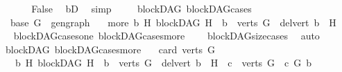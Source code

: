 \begin{isabellebody}
\ \ \ \ \isamarkupfalse%
\ \isamarkupfalse%
\ {\isachardoublequoteopen}False{\isachardoublequoteclose}\ \isamarkupfalse%
\ bD\ \isamarkupfalse%
\ simp\isanewline
\ \ \isamarkupfalse%
\isanewline
{}\isamarkupfalse%
%
\endisatagproof
{\isafoldproof}%
%
\isadelimproof
\isanewline
%
\endisadelimproof
\isanewline
{}\isamarkupfalse%
\ {\isacharparenleft}{\kern0pt}\ blockDAG{\isacharparenright}{\kern0pt}\ blockDAG{\isacharunderscore}{\kern0pt}cases{\isacharcolon}{\kern0pt}\isanewline
\ \ \ {\isacharparenleft}{\kern0pt}base{\isacharparenright}{\kern0pt}\ {\isachardoublequoteopen}{\isacharparenleft}{\kern0pt}G\ {\isacharequal}{\kern0pt}\ gen{\isacharunderscore}{\kern0pt}graph{\isacharparenright}{\kern0pt}{\isachardoublequoteclose}\isanewline
\ \ {\isacharbar}{\kern0pt}\ {\isacharparenleft}{\kern0pt}more{\isacharparenright}{\kern0pt}\ {\isachardoublequoteopen}{\isacharparenleft}{\kern0pt}{\isasymexists}b\ H{\isachardot}{\kern0pt}\ {\isacharparenleft}{\kern0pt}blockDAG\ H\ {\isasymand}\ b\ {\isasymin}\ verts\ G\ {\isasymand}\ del{\isacharunderscore}{\kern0pt}vert\ b\ {\isacharequal}{\kern0pt}\ H{\isacharparenright}{\kern0pt}{\isacharparenright}{\kern0pt}{\isachardoublequoteclose}\isanewline
%
\isadelimproof
\ \ %
\endisadelimproof
%
\isatagproof
{}\isamarkupfalse%
\ blockDAG{\isacharunderscore}{\kern0pt}cases{\isacharunderscore}{\kern0pt}one\ blockDAG{\isacharunderscore}{\kern0pt}cases{\isacharunderscore}{\kern0pt}more\isanewline
\ \ \ \ blockDAG{\isacharunderscore}{\kern0pt}size{\isacharunderscore}{\kern0pt}cases\ \isamarkupfalse%
\ auto%
\endisatagproof
{\isafoldproof}%
%
\isadelimproof
\isanewline
%
\endisadelimproof
\isanewline
{}\isamarkupfalse%
\ {\isacharparenleft}{\kern0pt}\ blockDAG{\isacharparenright}{\kern0pt}\ blockDAG{\isacharunderscore}{\kern0pt}cases{\isacharunderscore}{\kern0pt}more{}{\isacharcolon}{\kern0pt}\isanewline
\ \ \ {\isachardoublequoteopen}card\ {\isacharparenleft}{\kern0pt}verts\ G{\isacharparenright}{\kern0pt}\ {\isachargreater}{\kern0pt}\ {}{\isachardoublequoteclose}\isanewline
\ \ \ \ {\isachardoublequoteopen}{\isacharparenleft}{\kern0pt}{\isasymexists}b\ H{\isachardot}{\kern0pt}\ {\isacharparenleft}{\kern0pt}blockDAG\ H\ {\isasymand}\ b\ {\isasymin}\ verts\ G\ {\isasymand}\ del{\isacharunderscore}{\kern0pt}vert\ b\ {\isacharequal}{\kern0pt}\ H\ {\isasymand}\ {\isacharparenleft}{\kern0pt}{\isasymforall}c\ {\isasymin}\ verts\ G{\isachardot}{\kern0pt}\ {\isasymnot}\ c\ {\isasymrightarrow}\isactrlsup {\isacharplus}{\kern0pt}\isactrlbsub G\isactrlesub \ b{\isacharparenright}{\kern0pt}{\isacharparenright}{\kern0pt}{\isacharparenright}{\kern0pt}{\isachardoublequoteclose}\isanewline

\end{isabellebody}
